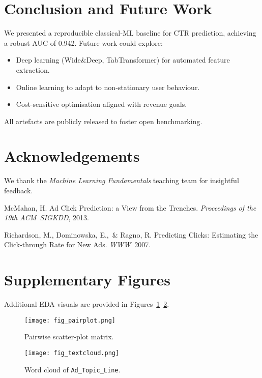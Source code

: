 \documentclass[12pt]{article}
\begin{document}
\section{Conclusion and Future Work}\label{sec:conclusion}
We presented a reproducible classical‑ML baseline for CTR prediction, achieving a robust AUC of \num{0.942}. Future work could explore:\vspace{-0.25em}
\begin{itemize}[noitemsep]
  \item Deep learning (Wide\&Deep, TabTransformer) for automated feature extraction.
  \item Online learning to adapt to non‑stationary user behaviour.
  \item Cost‑sensitive optimisation aligned with revenue goals.
\end{itemize}
All artefacts are publicly released to foster open benchmarking.

\section*{Acknowledgements}
We thank the \textit{Machine Learning Fundamentals} teaching team for insightful feedback.


\begin{thebibliography}{9}
McMahan, H.
\newblock Ad Click Prediction: a View from the Trenches.
\newblock \emph{Proceedings of the 19th ACM SIGKDD}, 2013.

Richardson, M., Dominowska, E., \& Ragno, R.
\newblock Predicting Clicks: Estimating the Click‑through Rate for New Ads.
\newblock \emph{WWW} 2007.
\end{thebibliography}

\appendix
\section{Supplementary Figures}
Additional EDA visuals are provided in Figures~\ref{fig:pairplot}–\ref{fig:textcloud}.

\begin{figure}[H]
    \centering
    \texttt{[image: fig\_pairplot.png]}
    \caption{Pairwise scatter‑plot matrix.}
    \label{fig:pairplot}
\end{figure}

\begin{figure}[H]
    \centering
    \texttt{[image: fig\_textcloud.png]}
    \caption{Word cloud of \texttt{Ad\_Topic\_Line}.}
    \label{fig:textcloud}
\end{figure}

\end{document}
